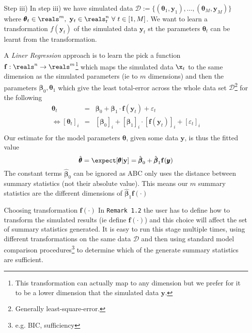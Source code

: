 \documentclass[11pt,a4paper]{article}
\begin{document}
  \begin{remark}{Step iii)}
    In step iii) we have simulated data $\mathcal{D}:=\{(\pmb\theta_1,\mathbf{y}_1),\dots,(\pmb\theta_M,\mathbf{y}_M)\}$ where $\pmb\theta_t\in\reals^m,\ \mathbf{y}_t\in\reals_t^n\ \forall\ t\in[1,M]$. We want to learn a transformation $f(\mathbf{y}_t)$ of the simulated data $\mathbf{y}_t$ st the parameters $\pmb\theta_t$ can be learnt from the transformation.
    \par A \textit{Liner Regression} approach is to learn the pick a function $\mathbf{f}:\reals^n\to\reals^m$\footnote{This transformation can actually map to any dimension but we prefer for it to be a lower dimension that the simulated data $\mathbf{y}$.} which maps the simulated data $\x_t$ to the same dimension as the simulated parameters (ie to $m$ dimensions) and then the parameters $\pmb\beta_0,\pmb\theta_1$ which give the least total-error across the whole data set $\mathcal{D}$\footnote{Generally least-square-error.} for the following
    \[\begin{array}{rcl}
      \pmb\theta_t&=&\pmb\beta_0+\pmb\beta_1\cdot \mathbf{f}(\mathbf{y}_t)+\varepsilon_t\\
      \Leftrightarrow[\pmb\theta_t]_i&=&[\pmb\beta_0]_i+[\pmb\beta_1]_i\cdot[\mathbf{f}(\mathbf{y}_t)]_i+[\varepsilon_t]_i\\
    \end{array}\]
    Our estimate for the model parameters $\pmb\theta$, given some data $\mathbf{y}$, is thus the fitted value
    \[ \hat{\pmb\theta}=\expect[\pmb\theta|\mathbf{y}]=\hat{\pmb\beta}_0+\hat{\pmb\beta}_1 \mathbf{f}(\pmb{y}) \]
    The constant terms $\hat{\pmb\beta}_0$ can be ignored as ABC only uses the distance between summary statistics (not their absolute value). This means our $m$ summary statistics are the different dimensions of $\hat{\pmb\beta}_1\mathbf{f}(\cdot)$
  \end{remark}

  \begin{remark}{Choosing transformation $\mathbf{f}(\cdot)$}
    In \texttt{Remark 1.2}  the user has to define how to transform the simulated results (ie define $\mathbf{f}(\cdot)$) and this choice will affect the set of summary statistics generated. It is easy to run this stage multiple times, using different transformations on the same data $\mathcal{D}$ and then using standard model comparison procedures\footnote{e.g. BIC, sufficiency} to determine which of the generate summary statistics are sufficient.
  \end{remark}

\newpage


\end{document}
